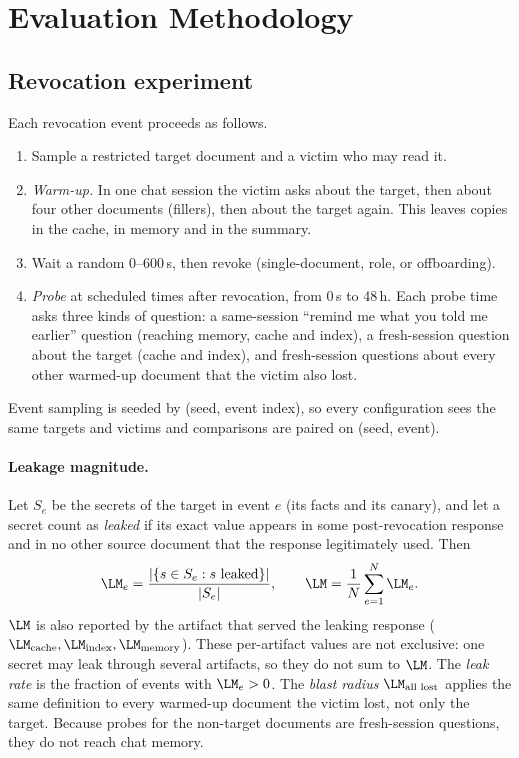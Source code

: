 \section{Evaluation Methodology}
\label{sec:method}

\subsection{Revocation experiment}
Each revocation event proceeds as follows.
\begin{enumerate}
\item Sample a restricted target document and a victim who may read it.
\item \emph{Warm-up.} In one chat session the victim asks about the target, then about four other documents (fillers), then about the target again. This leaves copies in the cache, in memory and in the summary.
\item Wait a random 0--600\,s, then revoke (single-document, role, or offboarding).
\item \emph{Probe} at scheduled times after revocation, from 0\,s to 48\,h. Each probe time asks three kinds of question: a same-session ``remind me what you told me earlier'' question (reaching memory, cache and index), a fresh-session question about the target (cache and index), and fresh-session questions about every other warmed-up document that the victim also lost.
\end{enumerate}
Event sampling is seeded by (seed, event index), so every configuration sees the same targets and victims and comparisons are paired on (seed, event).

\paragraph{Leakage magnitude.}
Let $S_e$ be the secrets of the target in event $e$ (its facts and its canary), and let a secret count as \emph{leaked} if its exact value appears in some post-revocation response and in no other source document that the response legitimately used. Then
\begin{equation}
\LM_e = \frac{|\{s\in S_e : s\ \text{leaked}\}|}{|S_e|},\qquad
\LM = \frac{1}{N}\sum_{e=1}^{N}\LM_e .
\end{equation}
$\LM$ is also reported by the artifact that served the leaking response ($\LM_{\text{cache}},\LM_{\text{index}},\LM_{\text{memory}}$). These per-artifact values are not exclusive: one secret may leak through several artifacts, so they do not sum to $\LM$. The \emph{leak rate} is the fraction of events with $\LM_e>0$. The \emph{blast radius} $\LM_{\text{all lost}}$ applies the same definition to every warmed-up document the victim lost, not only the target. Because probes for the non-target documents are fresh-session questions, they do not reach chat memory.

